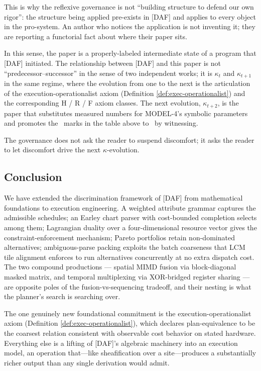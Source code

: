 This is why the reflexive governance is not ``building
structure to defend our own rigor'': the structure
being applied pre-exists in [DAF] and applies to
every object in the pro-system. An author who notices
the application is not inventing it; they are reporting
a functorial fact about where their paper sits.

In this sense, the paper is a properly-labeled
intermediate state of a program that [DAF]
initiated. The relationship between [DAF] and this
paper is not ``predecessor--successor'' in the sense
of two independent works; it is $\kappa_t$ and
$\kappa_{t+1}$ in the same regime, where the
evolution from one to the next is the articulation
of the execution-operationalist axiom
(Definition \ref{def:exec-operationalist}) and the
corresponding \textsf{H} / \textsf{R} / \textsf{F}
axiom classes. The next evolution, $\kappa_{t+2}$,
is the paper that substitutes measured numbers for
MODEL-4's symbolic parameters and promotes the
\gmark\ marks in the table above to \cmark\ by
witnessing.

The governance does not ask the reader to suspend
discomfort; it asks the reader to let discomfort
drive the next $\kappa$-evolution.

\subsection{Conclusion}

We have extended the discrimination framework of
[DAF] from mathematical foundations to execution
engineering. A weighted attribute grammar captures
the admissible schedules; an Earley chart parser
with cost-bounded completion selects among them;
Lagrangian duality over a four-dimensional resource
vector gives the constraint-enforcement mechanism;
Pareto portfolios retain non-dominated alternatives;
ambiguous-parse packing exploits the batch coarseness
that LCM tile alignment enforces to run alternatives
concurrently at no extra dispatch cost. The two
compound productions --- spatial MIMD fusion via
block-diagonal masked matrix, and temporal
multiplexing via XOR-bridged register sharing ---
are opposite poles of the fusion-vs-sequencing
tradeoff, and their nesting is what the planner's
search is searching over.

The one genuinely new foundational commitment is
the execution-operationalist axiom
(Definition \ref{def:exec-operationalist}), which
declares plan-equivalence to be the coarsest
relation consistent with observable cost behavior
on stated hardware. Everything else is a lifting
of [DAF]'s algebraic machinery into an execution
model, an operation that---like sheafification over
a site---produces a substantially richer output
than any single derivation would admit.
